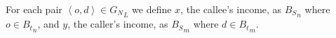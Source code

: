 For each pair \( \left< o, d \right> \in {G_N}_L \) we define \( x \), the callee's income, as \( {B_S}_n \) where \( o \in {B_t}_n \), and \( y \), the caller's income, as \( {B_S}_m \) where \( d \in {B_t}_m \).